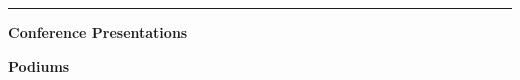 \documentclass[10pt]{letter}
\begin{document}
\par\noindent\rule{\textwidth}{0.5pt}



\begin{center}
\textbf{\large Conference Presentations} \\
\end{center}
\vspace{-5pt}
\begin{center}
\textbf{Podiums} \\
\end{center}
\vspace{-5pt}
\end{document}

